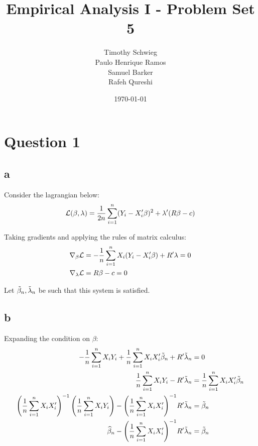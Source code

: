 \documentclass[12pt]{paper}
\begin{document}
\author{
{Timothy Schwieg}\\
{Paulo Henrique Ramos}\\
{Samuel Barker}\\
{Rafeh Qureshi}
}

\date{\today}
\title{Empirical Analysis I -  Problem Set 5}

\maketitle

\section*{Question 1}

\subsection*{a}

Consider the lagrangian below:
\begin{equation*}
  \mathcal{L}(\beta,\lambda) = \frac{1}{2n} \sum_{i=1}^n ( Y_i - X_i' \beta)^2 + \lambda' ( R
  \beta - c)
\end{equation*}

Taking gradients and applying the rules of matrix calculus:
\begin{align*}
  \nabla_{\beta} \mathcal{L} &= -\frac{1}{n}\sum_{i=1}^n X_i ( Y_i - X_i' \beta) + R' \lambda
  = 0\\
  \nabla_{\lambda} \mathcal{L} &= R \beta - c = 0
\end{align*}

Let $\tilde{ \beta }_{n}, \tilde{ \lambda }_{n}$ be such that this system is satisfied. 

\subsection*{b}

Expanding the condition on $\beta$:
\begin{align*}
 - \frac{1}{n}\sum_{i=1}^n X_i Y_i +\frac{1}{n} \sum_{i=1}^n X_i X_i'
  \tilde{ \beta }_{n} + R' \tilde{ \lambda }_{n} &= 0\\
  \frac{1}{n} \sum_{i=1}^n X_i Y_i - R' \tilde{ \lambda }_{n} &= \frac{1}{n}
                                                  \sum_{i=1}^n X_i X_i'
                                                  \tilde{ \beta }_{n}\\
  {\left( \frac{1}{n} \sum_{i=1}^n X_i X_i'  \right)}^{-1} \left(
  \frac{1}{n} \sum_{i=1}^n  X_i Y_i \right) - {\left( \frac{1}{n}
  \sum_{i=1}^n X_i X_i'  \right)}^{-1} R' \tilde{ \lambda }_{n} &= \tilde{ \beta }_{n}\\
  \widehat{ \beta }_{n} - {\left( \frac{1}{n} \sum_{i=1}^n X_i X_i'
  \right)}^{-1} R' \tilde{ \lambda }_{n} &= \tilde{ \beta }_{n}
\end{align*}
\end{document}
